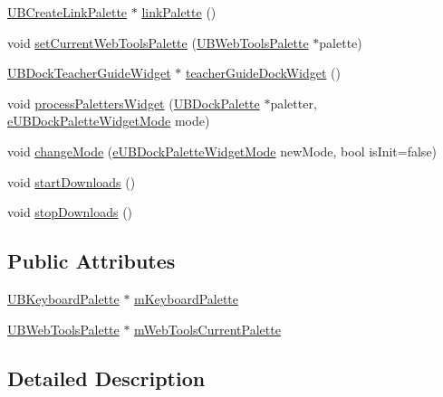 \begin{DoxyCompactItemize}
\hyperlink{class_u_b_create_link_palette}{U\-B\-Create\-Link\-Palette} $\ast$ \hyperlink{class_u_b_board_palette_manager_ad11cb96ff392a1f70ec87784dcd80039}{link\-Palette} ()
\item 
void \hyperlink{class_u_b_board_palette_manager_ade0277d7ebc8864c40b6dfde9f2091cf}{set\-Current\-Web\-Tools\-Palette} (\hyperlink{class_u_b_web_tools_palette}{U\-B\-Web\-Tools\-Palette} $\ast$palette)
\item 
\hyperlink{class_u_b_dock_teacher_guide_widget}{U\-B\-Dock\-Teacher\-Guide\-Widget} $\ast$ \hyperlink{class_u_b_board_palette_manager_acb290823de3668d04b0f653e5a8f01e8}{teacher\-Guide\-Dock\-Widget} ()
\item 
void \hyperlink{class_u_b_board_palette_manager_a10c1088a83192ce41c4cfa660886ae97}{process\-Paletters\-Widget} (\hyperlink{class_u_b_dock_palette}{U\-B\-Dock\-Palette} $\ast$paletter, \hyperlink{_u_b_dock_palette_widget_8h_af3b2828ed1bf91ad13c73e4e1b3b529e}{e\-U\-B\-Dock\-Palette\-Widget\-Mode} mode)
\item 
void \hyperlink{class_u_b_board_palette_manager_a0fb81635b0f7c6afdcd982d61b9acc66}{change\-Mode} (\hyperlink{_u_b_dock_palette_widget_8h_af3b2828ed1bf91ad13c73e4e1b3b529e}{e\-U\-B\-Dock\-Palette\-Widget\-Mode} new\-Mode, bool is\-Init=false)
\item 
void \hyperlink{class_u_b_board_palette_manager_ac22e898462f43afb35fd929ef6523bfd}{start\-Downloads} ()
\item 
void \hyperlink{class_u_b_board_palette_manager_a9b076bd5e9b0066353797f86bcfe09f8}{stop\-Downloads} ()
\end{DoxyCompactItemize}
\subsection*{Public Attributes}
\begin{DoxyCompactItemize}
\item 
\hyperlink{class_u_b_keyboard_palette}{U\-B\-Keyboard\-Palette} $\ast$ \hyperlink{class_u_b_board_palette_manager_a01a14c9ae374265868a703f63770b5df}{m\-Keyboard\-Palette}
\item 
\hyperlink{class_u_b_web_tools_palette}{U\-B\-Web\-Tools\-Palette} $\ast$ \hyperlink{class_u_b_board_palette_manager_a2e6478b9eff52e3d2681705a6db41a77}{m\-Web\-Tools\-Current\-Palette}
\end{DoxyCompactItemize}


\subsection{Detailed Description}


